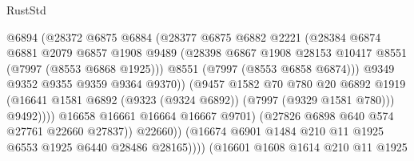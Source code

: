 \begin{lexlean}{RustStd}
\begin{coremodule}
{\begin{coremodule}
{{{{{{{{{{{{{{{{{{{{{{{{{{{{{{{{{{{{{{{{{{{                                    @6894
                                    (@28372
                                      @6875
                                      @6884
                                      (@28377
                                        @6875
                                        @6882
                                        @2221
                                        (@28384
                                          @6874
                                          @6881
                                          @2079
                                          @6857
                                          @1908
                                          @9489
                                          (@28398
                                            @6867
                                            @1908
                                            @28153
                                            @10417
                                            @8551
                                            (@7997 (@8553 @6868 @1925)))
                                          @8551
                                          (@7997 (@8553 @6858 @6874)))
                                        @9349
                                        @9352
                                        @9355
                                        @9359
                                        @9364
                                        @9370))
                                    (@9457
                                      @1582
                                      @70
                                      @780
                                      @20
                                      @6892
                                      @1919
                                      (@16641
                                        @1581
                                        @6892
                                        (@9323 (@9324 @6892))
                                        (@7997 (@9329 @1581 @780)))
                                      @9492))))
                              @16658
                              @16661
                              @16664
                              @16667
                              @9701)
                            (@27826 @6898 @640 @574 @27761 @22660 @27837))
                          @22660))
                      (@16674 @6901 @1484 @210 @11 @1925 @6553 @1925 @6440 @28486 @28165))))
                (@16601
                  @1608
                  @1614
                  @210
                  @11
                  @1925
}}}}}}}}}}}}}}}}}}}}}}}}}}}}}}}}}}}}}}}}}}}
\end{coremodule}}
\end{coremodule}
\end{lexlean}
